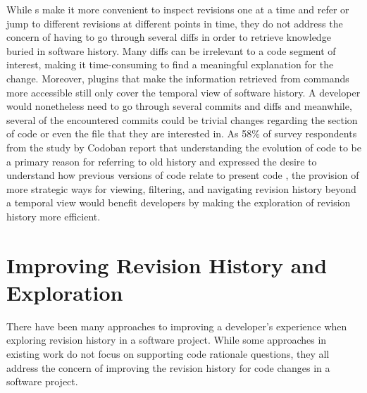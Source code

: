 While s make it more convenient to inspect revisions one at a time and refer 
or jump to different revisions at different points in time, they do not address the concern 
of having to go through several diffs
in order to retrieve knowledge buried in software history. 
Many diffs can be irrelevant to a code segment of interest, 
making it time-consuming to find a meaningful explanation for the change.
Moreover, plugins that make the information retrieved from  commands more 
accessible still only cover the temporal view of software history.
A developer would nonetheless need to go through several commits and diffs and meanwhile, 
several of the encountered commits could be trivial changes regarding the section of code 
or even the file that they are interested in.
As 58\% of survey respondents from the study by Codoban \etal report
that understanding the evolution of code to be a primary reason for
referring to old history and expressed the desire to
understand how previous versions of code relate to present code \cite{codoban_software_2015},
the provision of more strategic ways for viewing, filtering, and 
navigating revision history beyond a temporal view would benefit developers by 
making the exploration of revision history more efficient.


\section{Improving Revision History and Exploration}

There have been many approaches to improving a developer's experience when exploring revision history in a software project. 
While some approaches in existing work do not focus on supporting code rationale questions, 
they all address the concern of improving the revision history for code changes in a software project.

